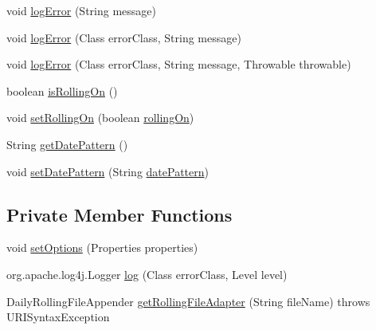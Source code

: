 \begin{DoxyCompactItemize}
void \mbox{\hyperlink{classnet_1_1dlinkddns_1_1atulsaurabh_1_1hasselfreelogger_1_1impl_1_1_hassel_free_logger_a94641af9c6c39ea601d5c41bf68a4b1f}{log\+Error}} (String message)
\item 
void \mbox{\hyperlink{classnet_1_1dlinkddns_1_1atulsaurabh_1_1hasselfreelogger_1_1impl_1_1_hassel_free_logger_a47870e52004c823f0ef365f5d41afd6b}{log\+Error}} (Class error\+Class, String message)
\item 
void \mbox{\hyperlink{classnet_1_1dlinkddns_1_1atulsaurabh_1_1hasselfreelogger_1_1impl_1_1_hassel_free_logger_acf886c01c94bba98b551f98e2ad8ce4f}{log\+Error}} (Class error\+Class, String message, Throwable throwable)
\item 
boolean \mbox{\hyperlink{classnet_1_1dlinkddns_1_1atulsaurabh_1_1hasselfreelogger_1_1impl_1_1_hassel_free_logger_a1264dcefa68828985aa843e545ff41b6}{is\+Rolling\+On}} ()
\item 
void \mbox{\hyperlink{classnet_1_1dlinkddns_1_1atulsaurabh_1_1hasselfreelogger_1_1impl_1_1_hassel_free_logger_a9ef8b4f7c9615f50c03f168f1b949f64}{set\+Rolling\+On}} (boolean \mbox{\hyperlink{classnet_1_1dlinkddns_1_1atulsaurabh_1_1hasselfreelogger_1_1impl_1_1_hassel_free_logger_a7d4b387ecfa16af11b2b169ac3f062a3}{rolling\+On}})
\item 
String \mbox{\hyperlink{classnet_1_1dlinkddns_1_1atulsaurabh_1_1hasselfreelogger_1_1impl_1_1_hassel_free_logger_a9b56e6059627b493e8f5ebff888795a0}{get\+Date\+Pattern}} ()
\item 
void \mbox{\hyperlink{classnet_1_1dlinkddns_1_1atulsaurabh_1_1hasselfreelogger_1_1impl_1_1_hassel_free_logger_a72529568d69eea543b2238a466cedf8d}{set\+Date\+Pattern}} (String \mbox{\hyperlink{classnet_1_1dlinkddns_1_1atulsaurabh_1_1hasselfreelogger_1_1impl_1_1_hassel_free_logger_aa2dcc355996a8d6e3cc52fad0774f0fd}{date\+Pattern}})
\end{DoxyCompactItemize}
\subsection*{Private Member Functions}
\begin{DoxyCompactItemize}
\item 
void \mbox{\hyperlink{classnet_1_1dlinkddns_1_1atulsaurabh_1_1hasselfreelogger_1_1impl_1_1_hassel_free_logger_af159818a248f7cd39c79ead6e08efda8}{set\+Options}} (Properties properties)
\item 
org.\+apache.\+log4j.\+Logger \mbox{\hyperlink{classnet_1_1dlinkddns_1_1atulsaurabh_1_1hasselfreelogger_1_1impl_1_1_hassel_free_logger_af0d3b51d857b4df4ef5f5356e2e07ada}{log}} (Class error\+Class, Level level)
\item 
Daily\+Rolling\+File\+Appender \mbox{\hyperlink{classnet_1_1dlinkddns_1_1atulsaurabh_1_1hasselfreelogger_1_1impl_1_1_hassel_free_logger_a33e52eaefee44a20c6146c29abf4fb3d}{get\+Rolling\+File\+Adapter}} (String file\+Name)  throws U\+R\+I\+Syntax\+Exception   
\end{DoxyCompactItemize}
